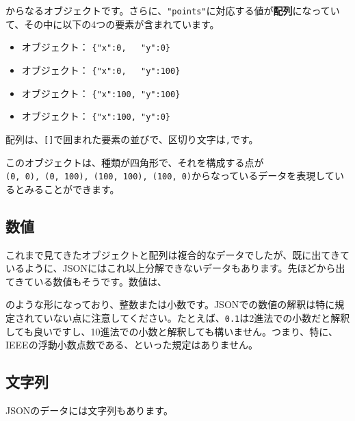 からなるオブジェクトです。さらに、\texttt{"points"}に対応する値が\textbf{配列}になっていて、その中に以下の4つの要素が含まれています。

\begin{itemize}
\tightlist
\item
  オブジェクト： \texttt{\{"x":0,\ \ \ "y":0\}}
\item
  オブジェクト： \texttt{\{"x":0,\ \ \ "y":100\}}
\item
  オブジェクト： \texttt{\{"x":100,\ "y":100\}}
\item
  オブジェクト： \texttt{\{"x":100,\ "y":0\}}
\end{itemize}

配列は、\texttt{{[}{]}}で囲まれた要素の並びで、区切り文字は\texttt{,}です。

このオブジェクトは、種類が四角形で、それを構成する点が\texttt{(0,\ 0),\ (0,\ 100),\ (100,\ 100),\ (100,\ 0)}からなっているデータを表現しているとみることができます。

\hypertarget{chapter3-ux6570ux5024}{%
\subsection{数値}\label{chapter3-ux6570ux5024}}

これまで見てきたオブジェクトと配列は複合的なデータでしたが、既に出てきているように、JSONにはこれ以上分解できないデータもあります。先ほどから出てきている数値もそうです。数値は、

\begin{Shaded}
\begin{Highlighting}[]
\end{Highlighting}
\end{Shaded}

のような形になっており、整数または小数です。JSONでの数値の解釈は特に規定されていない点に注意してください。たとえば、\texttt{0.1}は2進法での小数だと解釈しても良いですし、10進法での小数と解釈しても構いません。つまり、特に、IEEEの浮動小数点数である、といった規定はありません。

\hypertarget{chapter3-ux6587ux5b57ux5217}{%
\subsection{文字列}\label{chapter3-ux6587ux5b57ux5217}}

JSONのデータには文字列もあります。

\begin{Shaded}
\begin{Highlighting}[]
\end{Highlighting}
\end{Shaded}

